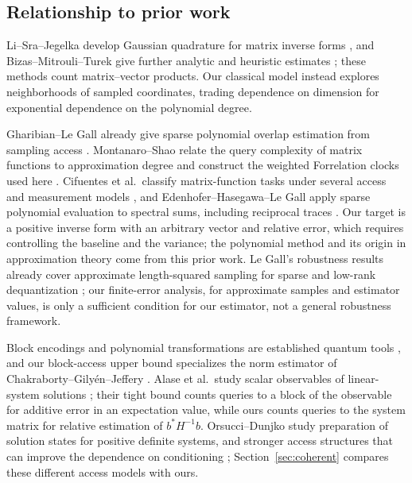 \subsection{Relationship to prior work}
Li--Sra--Jegelka develop Gaussian quadrature for matrix inverse forms
\citep{LiSraJegelka2016}, and Bizas--Mitrouli--Turek give further analytic
and heuristic estimates \citep{BizasMitrouliTurek2025}; these methods
count matrix--vector products. Our classical model instead explores
neighborhoods of sampled coordinates, trading dependence on dimension for
exponential dependence on the polynomial degree.

Gharibian--Le Gall already give sparse polynomial overlap estimation from
sampling access \citep[Theorem 4.1]{GharibianLeGall2022}.
Montanaro--Shao relate the query complexity of matrix functions to
approximation degree and construct the weighted Forrelation clocks used
here \citep[Theorem 1.8]{MontanaroShao2023}. Cifuentes et al.\ classify
matrix-function tasks under several access and measurement models
\citep{CifuentesEtAl2024}, and Edenhofer--Hasegawa--Le Gall apply sparse
polynomial evaluation to spectral sums, including reciprocal traces
\citep[Theorem 3.1 and Section 3.3]{EdenhoferEtAl2026}. Our target is a positive inverse form
with an arbitrary vector and relative error, which requires controlling
the baseline and the variance; the polynomial method and its origin in
approximation theory come from this prior work. Le Gall's robustness results already cover
approximate length-squared sampling for sparse and low-rank
dequantization \citep{LeGall2025}; our finite-error analysis, for
approximate samples and estimator values, is only a sufficient condition
for our estimator, not a general robustness framework.

Block encodings and polynomial transformations are established quantum
tools \citep{GilyenEtAl2019}, and our block-access upper
bound specializes the norm estimator of Chakraborty--Gily\'en--Jeffery
\citep[Theorem 33 in the full version]{ChakrabortyGilyenJeffery2019}.
Alase et al.\ study scalar observables of linear-system solutions
\citep{AlaseEtAl2022}; their tight bound counts queries to a block of
the observable for additive error in an expectation value, while ours
counts queries to the system matrix for relative estimation of
$b^*H^{-1}b$. Orsucci--Dunjko study preparation of solution states for
positive definite systems, and stronger access structures that can
improve the dependence on conditioning \citep{OrsucciDunjko2021};
Section~\ref{sec:coherent} compares these different access models with
ours.

